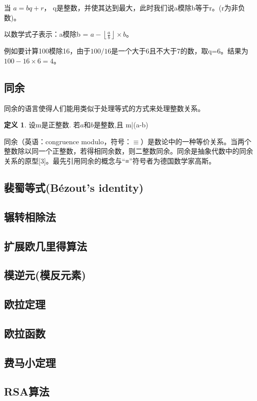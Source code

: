 \documentclass{article}
\theoremstyle{definition}
\newtheorem{dfn}{定义}[section]
\theoremstyle{remark}
\theoremstyle{plain}
\begin{document}
当 $a = bq + r$， q是整数，并使其达到最大，此时我们说a模除b等于r。(r为非负数)。

以数学式子表示：a模除b = $a-\left\lfloor \frac{a}{b}\right\rfloor \times b$。

例如要计算100模除16，由于$100/16$是一个大于6且不大于7的数，取q=6。结果为$100-16\times6=4$。



\subsection{同余}   
同余的语言使得人们能用类似于处理等式的方式来处理整数关系。

\begin{dfn}
设m是正整数. 若$a$和$b$是整数,且 m|(a-b)
\end{dfn}

同余\cite{WEBSITE:congruence_modulo}（英语：congruence modulo，符号：$\equiv$）是数论中的一种等价关系。当两个整数除以同一个正整数，若得相同余数，则二整数同余。同余是抽象代数中的同余关系的原型[3]。最先引用同余的概念与“≡”符号者为德国数学家高斯。


\subsection{裴蜀等式(Bézout's identity)}   
\subsection{辗转相除法}   
\subsection{扩展欧几里得算法}   
\subsection{模逆元(模反元素)}   
\subsection{欧拉定理}   
\subsection{欧拉函数}   
\subsection{费马小定理}   
\subsection{RSA算法}   
 

 

\end{document}
